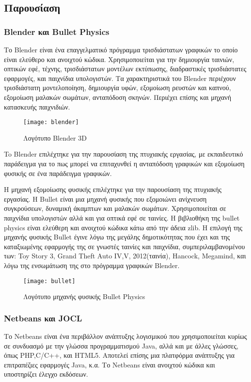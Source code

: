 \subsection{Παρουσίαση}
\subsubsection{Blender και Bullet Physics}
Το Blender είναι ένα επαγγελματικό πρόγραμμα τρισδιάστατων γραφικών το οποίο είναι ελεύθερο και ανοιχτού κώδικα. Χρησιμοποιείται για την δημιουργία ταινιών, οπτικών εφέ, τέχνης, τρισδιάστατων μοντέλων εκτύπωσης, διαδραστικές τρισδιάστατες εφαρμογές, και παιχνίδια υπολογιστών. Τα χαρακτηριστικά του Blender περιέχουν τρισδιάστατη μοντελοποίηση, δημιουργία υφών, εξομοίωση ρευστών και καπνού, εξομοίωση μαλακών σωμάτων, ανταπόδοση σκηνών. Περιέχει επίσης και μηχανή κατασκευής παιχνιδιών.
\begin{figure}[h]
\centering
\texttt{[image: blender]}
\caption{Λογότυπο Blender 3D\cite{figure-24}}
\end{figure}

To Blender επιλέχτηκε για την παρουσίαση της πτυχιακής εργασίας, με εκπαιδευτικό παράδειγμα για το πως μπορεί να επιταχυνθεί η ανταπόδοση γραφικών και εξομοίωση φυσικής σε ένα παράδειγμα γραφικών.

H μηχανή εξομοίωσης φυσικής επιλέχτηκε για την παρουσίαση της πτυχιακής εργασίας. H Bullet είναι μια μηχανή φυσικής που εξομοιώνει ανίχνευση συγκρούσεων, δυναμική άκαμπτων και μαλακών σωμάτων. Χρησιμοποιείται σε παιχνίδια υπολογιστών αλλά και για οπτικά εφέ σε ταινίες. Η βιβλιοθήκη της bullet physics είναι ελεύθερη και ανοιχτού κώδικα κάτω από την άδεια zlib. Η επιλογή της μηχανής φυσικής Bullet έγινε λόγω της μεγάλης δημοτικότητας που έχει και της καταξιωμένης εφαρμογής της σε γνωστές ταινίες και παιχνίδια, συμπεριλαμβανομένου των: Toy Story 3, Grand Theft Auto IV,V, 2012(ταινία), Hancock, Megamind, και λόγω της ενσωμάτωση της στο πρόγραμμα γραφικών Blender.

\begin{figure}[h]
\centering
\texttt{[image: bullet]}
\caption{Λογότυπο μηχανής φυσικής Bullet Physics\cite{figure-25}}
\end{figure}

\subsubsection{Netbeans και JOCL}
Το Netbeans είναι ένα περιβάλλον ανάπτυξης λογισμικού που χρησιμοποιείται κυρίως σε συνδυασμό με την γλώσσα προγραμματισμού Java, αλλά και με άλλες γλώσσες, όπως PHP,C/C++, και HTML5. Αποτελεί επίσης μια πλατφόρμα ανάπτυξης για επιτραπέζιες εφαρμογές Java, κ.α. Το Netbeans είναι ανοιχτού κώδικα και υποστηρίζει έλεγχο εκδόσεων.

